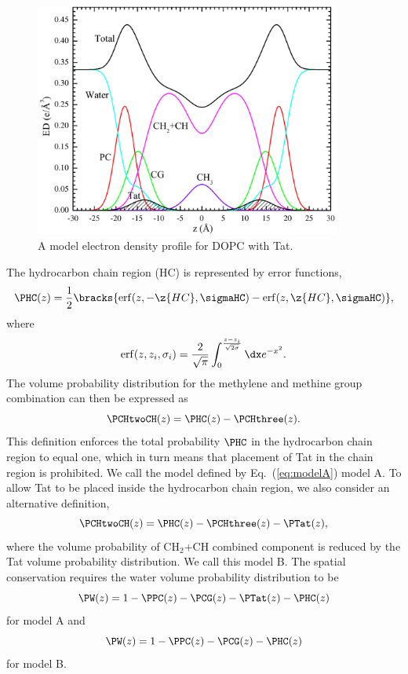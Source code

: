 \begin{figure}[htbp]
  \centering
  \includegraphics[width=0.9\textwidth]{figures/Tat/SDP_Results/EDP/DOPC_Tat_model_EDP}
  \caption{A model electron density profile for DOPC with Tat.}
  \label{fig:DOPC_EDP}
\end{figure}

The hydrocarbon chain region (HC) is represented by error functions,
\begin{equation}
  \PHC(z) = \frac{1}{2}\bracks{
    \mathrm{erf}(z,-\z{HC},\sigmaHC) - \mathrm{erf}(z,\z{HC},\sigmaHC)
  },
\end{equation}
where
\begin{equation}
  \mathrm{erf}(z,z_i,\sigma_i)=\frac{2}{\sqrt{\pi}}
    \int_0^{\frac{z-z_i}{\sqrt{2\sigma}}} \dx e^{-x^2}.
\end{equation}
The volume probability distribution for the methylene and methine group
combination can then be expressed as
\begin{equation}
  \PCHtwoCH(z) = \PHC(z)-\PCHthree(z).
  \label{eq:modelA}
\end{equation}
This definition enforces the total probability $\PHC$ in the hydrocarbon
chain region to equal one, which in turn means that placement of Tat in the  
chain region is prohibited. We call the model defined by Eq.~(\ref{eq:modelA})
model A. To allow Tat to be placed inside the hydrocarbon
chain region, we also consider an alternative definition,
\begin{equation}
  \PCHtwoCH(z) = \PHC(z)-\PCHthree(z) - \PTat(z),
\end{equation}
where the volume probability of CH$_2$+CH combined component is reduced by 
the Tat volume probability distribution. We call this model B.
The spatial conservation requires the water volume probability distribution 
to be
\begin{equation}
  \PW(z) = 1-\PPC(z)-\PCG(z)-\PTat(z)-\PHC(z)
\end{equation}
for model A and
\begin{equation}
  \PW(z) = 1-\PPC(z)-\PCG(z)-\PHC(z)
\end{equation}
for model B. 

